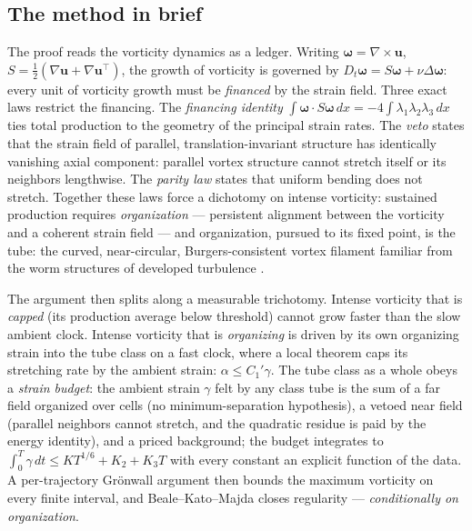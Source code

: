 \documentclass[11pt,letterpaper]{amsart}
\theoremstyle{definition}
\theoremstyle{remark}
\newcommand{\vort}{\boldsymbol{\omega}}
\newcommand{\uu}{\boldsymbol{u}}
\begin{document}
\subsection{The method in brief}\label{subsec:method}
The proof reads the vorticity dynamics as a ledger. Writing $\vort=\nabla\times\uu$,
$S=\tfrac12(\nabla\uu+\nabla\uu^{\top})$, the growth of vorticity is governed by
$D_t\vort=S\vort+\nu\Delta\vort$: every unit of vorticity growth must be
\emph{financed} by the strain field. Three exact laws restrict the financing. The
\emph{financing identity} $\int\vort\cdot S\vort\,dx=-4\int\lambda_1\lambda_2\lambda_3\,dx$
ties total production to the geometry of the principal strain rates. The \emph{veto}
states that the strain field of parallel, translation-invariant structure has
identically vanishing axial component: parallel vortex structure cannot stretch itself
or its neighbors lengthwise. The \emph{parity law} states that uniform bending does
not stretch. Together these laws force a dichotomy on intense vorticity: sustained
production requires \emph{organization} --- persistent alignment between the vorticity
and a coherent strain field --- and organization, pursued to its fixed point, is the
tube: the curved, near-circular, Burgers-consistent vortex filament familiar from the
worm structures of developed turbulence
\cite{JimenezWraySaffmanRogallo1993,MoffattKidaOhkitani1994}.

The argument then splits along a measurable trichotomy. Intense vorticity that is
\emph{capped} (its production average below threshold) cannot grow faster than the slow
ambient clock. Intense vorticity that is \emph{organizing} is driven by its own
organizing strain into the tube class on a fast clock, where a local theorem caps its
stretching rate by the ambient strain: $\alpha\le C_1'\gamma$. The tube class as a
whole obeys a \emph{strain budget}: the ambient strain $\gamma$ felt by any class tube
is the sum of a far field organized over cells (no minimum-separation hypothesis), a
vetoed near field (parallel neighbors cannot stretch, and the quadratic residue is
paid by the energy identity), and a priced background; the budget integrates to
$\int_0^T\gamma\,dt\le KT^{1/6}+K_2+K_3T$ with every constant an explicit function of
the data. A per-trajectory Gr\"onwall argument then bounds the maximum vorticity on
every finite interval, and Beale--Kato--Majda \cite{BealeKatoMajda1984} closes
regularity --- \emph{conditionally on organization}.
\end{document}
